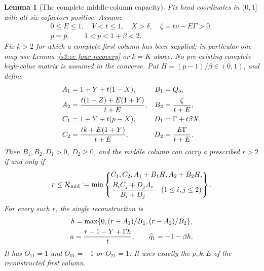 \documentclass[11pt,reqno]{amsart}
\newtheorem{lemma}[theorem]{Lemma}
\theoremstyle{definition}
\theoremstyle{remark}
\begin{document}
\begin{lemma}[The complete middle-column capacity]
\label{s3:cc-middle-capacity}
Fix head coordinates in \((0,1]\) with all six cofactors positive.
Assume
\[
\begin{gathered}
 0\le E\le1,\quad V<t\le1,\quad X>\delta,\quad
 \zeta=t\nu-E\Gamma>0,\\
 p=\bar p,\qquad 1<p<1+\beta<2.
\end{gathered}
\]
Fix \(k>2\) for which a
complete first column has been supplied; in particular one may use
Lemma~\ref{s3:cc-four-recovery} or \(k=K\) above.
No pre-existing complete high-value matrix is assumed in the converse.
Put \(H=(p-1)/\beta\in(0,1)\), and define
\begin{align*}
 A_1&=1+Y+t(1-X),&B_1&=Q_o,\\
 A_2&={t(1+Z)+E(1+Y)\over t+E},&B_2&={\zeta\over t+E},\\
 C_1&=1+Y+t(p-X),&D_1&=\Gamma+t\beta X,\\
 C_2&={tk+E(1+Y)\over t+E},&D_2&={E\Gamma\over t+E}.
\end{align*}
Then \(B_1,B_2,D_1>0\), \(D_2\ge0\), and the middle
column can carry a prescribed \(r>2\) if and only if
\begin{equation}\label{s3:cc-middle-eight}
  r\le\mathcal R_{\rm mid}:=\min\left\{\begin{gathered}
  C_1,C_2,A_1+B_1H,A_2+B_2H,\\
  {B_iC_j+D_jA_i\over B_i+D_j}\quad(1\le i,j\le2)
 \end{gathered}\right\}.
\end{equation}
For every such \(r\), the single reconstruction is
\begin{equation}\label{s3:cc-middle-recovery}
 \begin{gathered} h=\max\{0,(r-A_1)/B_1,(r-A_2)/B_2\},\\
  a={r-1-Y+\Gamma h\over t},\qquad\widehat q_1=-1-\beta h.\end{gathered}
\end{equation}
It has \(O_{11}=1\) and \(O_{01}=-1\) or \(O_{21}=1\).
It uses exactly the \(p,k,E\) of the reconstructed first column.
\end{lemma}
\end{document}
